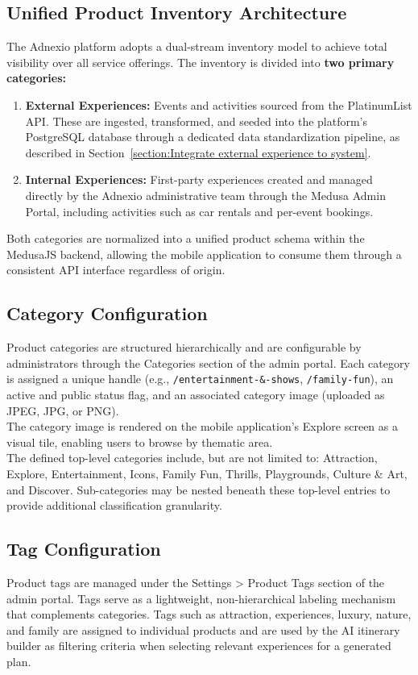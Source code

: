 \subsection{Unified Product Inventory Architecture}
The Adnexio platform adopts a dual-stream inventory model to achieve total visibility over all service offerings. The inventory is divided into \textbf{two primary categories:} \\
\begin{enumerate}
    \item \textbf{External Experiences:} Events and activities sourced from the PlatinumList API. These are ingested, transformed, and seeded into the platform's PostgreSQL database through a dedicated data standardization pipeline, as described in Section~\ref{section:Integrate external experience to system}.
    \item \textbf{Internal Experiences:} First-party experiences created and managed directly by the Adnexio administrative team through the Medusa Admin Portal, including activities such as car rentals and per-event bookings.
\end{enumerate}
Both categories are normalized into a unified product schema within the MedusaJS backend, allowing the mobile application to consume them through a consistent API interface regardless of origin.

\subsection{Category Configuration}
Product categories are structured hierarchically and are configurable by administrators through the Categories section of the admin portal. Each category is assigned a unique handle (e.g., \texttt{/entertainment-\&-shows}, \texttt{/family-fun}), an active and public status flag, and an associated category image (uploaded as JPEG, JPG, or PNG). \\
The category image is rendered on the mobile application's Explore screen as a visual tile, enabling users to browse by thematic area. \\
The defined top-level categories include, but are not limited to: Attraction, Explore, Entertainment, Icons, Family Fun, Thrills, Playgrounds, Culture \& Art, and Discover. Sub-categories may be nested beneath these top-level entries to provide additional classification granularity.

\subsection{Tag Configuration}
Product tags are managed under the Settings > Product Tags section of the admin portal. Tags serve as a lightweight, non-hierarchical labeling mechanism that complements categories. Tags such as attraction, experiences, luxury, nature, and family are assigned to individual products and are used by the AI itinerary builder as filtering criteria when selecting relevant experiences for a generated plan.

